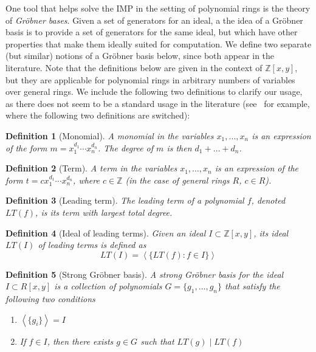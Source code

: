 \documentclass[11pt]{report}
\newtheorem{definition}{Definition}
\newcommand{\Z}{\mathbb{Z}}
\newcommand{\Zxy}{\mathbb{Z}[x,y]}
\begin{document}
One tool that helps solve the IMP in the setting of polynomial rings is the theory of \emph{Gr\"obner bases}. Given a set of generators for an ideal, a the idea of a Gr\"obner basis is to provide a set of generators for the same ideal, but which have other properties that make them ideally suited for computation. We define two separate (but similar) notions of a Gr\"obner basis below, since both appear in the literature. Note that the definitions below are given in the context of $\Zxy$, but they are applicable for polynomial rings in arbitrary numbers of variables over general rings. We include the following two definitions to clarify our usage, as there does not seem to be a standard usage in the literature (see~\cite{becker} for example, where the following two definitions are switched):

\begin{definition}[Monomial]
A \emph{monomial} in the variables $x_1,\dots, x_n$ is an expression of the form $m = x_1^{d_1}\cdots x_n^{d_n}$. The degree of $m$ is then $d_1+\ldots+d_n$.
\end{definition}

\begin{definition}[Term]
A \emph{term} in the variables $x_1,\dots, x_n$ is an expression of the form $t = cx_1^{d_1}\cdots x_n^{d_n}$, where $c\in \Z$ (in the case of general rings $R$, $c\in R$).
\end{definition}

\begin{definition}[Leading term]
The \emph{leading term} of a polynomial $f$, denoted $LT(f)$, is its term with largest total degree.
\end{definition}

\begin{definition}[Ideal of leading terms]
Given an ideal $I\subset \Zxy$, its ideal $LT(I)$ of leading terms is defined as
\[LT(I) = \left\langle\{LT(f) : f\in I\}\right\rangle \]
\end{definition}

\begin{definition}[Strong Gr\"obner basis]
A \emph{strong Gr\"obner basis} for the ideal $I\subset R[x,y]$ is a collection of polynomials $G=\{g_1,\dots,g_n\}$ that satisfy the following two conditions
\begin{enumerate}
\item $\left\langle\{g_i\}\right\rangle = I$
\item If $f\in I$, then there exists $g\in G$ such that $LT(g) \mid LT(f)$
\end{enumerate}
\end{definition}
\end{document}
